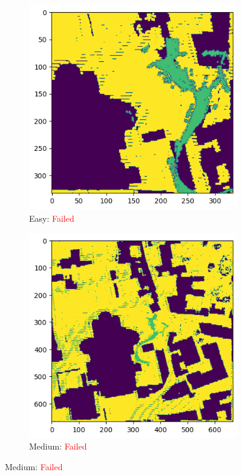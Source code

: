 \documentclass[11pt]{article}
\begin{document}
    \newpage
    \begin{figure}[p]
        \centering
        \begin{subfigure}{0.45\textwidth}
            \centering
            \includegraphics[width=\linewidth]{images/full/easy/5_2_3_easy}
            \caption{Easy: \textcolor{red}{Failed}}
            \label{fig:5_2_3_easy}
        \end{subfigure}
        \hfill
        \begin{subfigure}{0.45\textwidth}
            \centering
            \includegraphics[width=\linewidth]{images/full/medium/5_2_3_medium}
            \caption{Medium: \textcolor{red}{Failed}}
            \label{fig:5_2_3_medium}
        \end{subfigure}


\end{figure}
\end{document}

